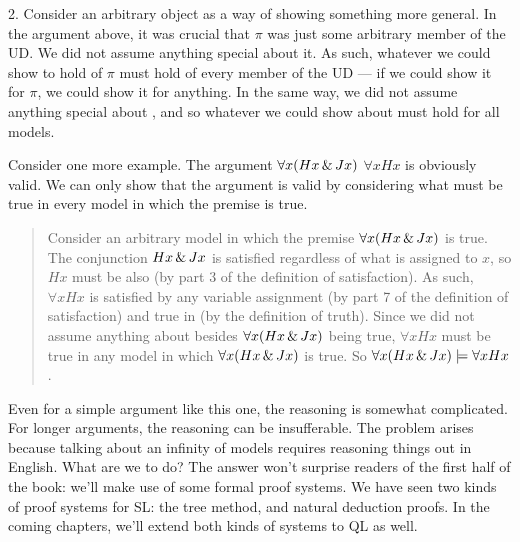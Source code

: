 2. Consider an arbitrary object as a way of showing something more general. In the argument above, it was crucial that $\pi$ was just some arbitrary member of the UD. We did not assume anything special about it. As such, whatever we could show to hold of $\pi$ must hold of every member of the UD --- if we could show it for $\pi$, we could show it for anything. In the same way, we did not assume anything special about , and so whatever we could show about  must hold for all models.

Consider one more example. The argument $\forall x(Hx \,\&\, Jx)$ \therefore  $\forall x Hx$ is obviously valid. We can only show that the argument is valid by considering what must be true in every model in which the premise is true.
\begin{quote}
Consider an arbitrary model  in which the premise $\forall x(Hx \,\&\, Jx)$ is true. The conjunction $Hx \,\&\, Jx$ is satisfied regardless of what is assigned to $x$, so $Hx$ must be also (by part 3 of the definition of {satisfaction}). As such, $\forall x Hx$ is satisfied by any variable assignment (by part 7 of the definition of {satisfaction}) and true in  (by the definition of {truth}).
Since we did not assume anything about  besides $\forall x(Hx \,\&\, Jx)$ being true, $\forall x Hx$ must be true in any model in which $\forall x(Hx \,\&\, Jx)$ is true. So $\forall x(Hx \,\&\, Jx) \models \forall x Hx$.
\end{quote}
Even for a simple argument like this one, the reasoning is somewhat complicated. For longer arguments, the reasoning can be insufferable. The problem arises because talking about an infinity of models requires reasoning things out in English. What are we to do? The answer won't surprise readers of the first half of the book: we'll make use of some formal proof systems. We have seen two kinds of proof systems for SL: the tree method, and natural deduction proofs. In the coming chapters, we'll extend both kinds of systems to QL as well.


\practiceproblems

